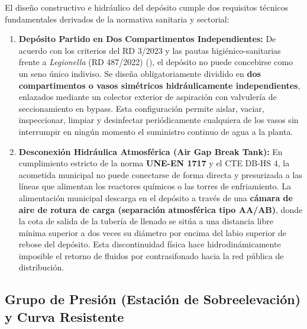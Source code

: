 \documentclass{report}
\begin{document}
El diseño constructivo e hidráulico del depósito cumple dos requisitos técnicos fundamentales derivados de la normativa sanitaria y sectorial:
\begin{enumerate}
    \item \textbf{Depósito Partido en Dos Compartimentos Independientes:}
          De acuerdo con los criterios del RD 3/2023 y las pautas higiénico-sanitarias frente a \textit{Legionella} (RD 487/2022) (\cite{RD3_2023, RD487_2022}), el depósito no puede concebirse como un seno único indiviso. Se diseña obligatoriamente dividido en \textbf{dos compartimentos o vasos simétricos hidráulicamente independientes}, enlazados mediante un colector exterior de aspiración con valvulería de seccionamiento en bypass. Esta configuración permite aislar, vaciar, inspeccionar, limpiar y desinfectar periódicamente cualquiera de los vasos sin interrumpir en ningún momento el suministro continuo de agua a la planta.
    \item \textbf{Desconexión Hidráulica Atmosférica (Air Gap Break Tank):}
          En cumplimiento estricto de la norma \textbf{UNE-EN 1717} y el CTE DB-HS 4, la acometida municipal no puede conectarse de forma directa y presurizada a las líneas que alimentan los reactores químicos o las torres de enfriamiento. La alimentación municipal descarga en el depósito a través de una \textbf{cámara de aire de rotura de carga (separación atmosférica tipo AA/AB)}, donde la cota de salida de la tubería de llenado se sitúa a una distancia libre mínima superior a dos veces su diámetro por encima del labio superior de rebose del depósito. Esta discontinuidad física hace hidrodinámicamente imposible el retorno de fluidos por contrasifonado hacia la red pública de distribución.
\end{enumerate}

\subsection{Grupo de Presión (Estación de Sobreelevación) y Curva Resistente}
\end{document}

